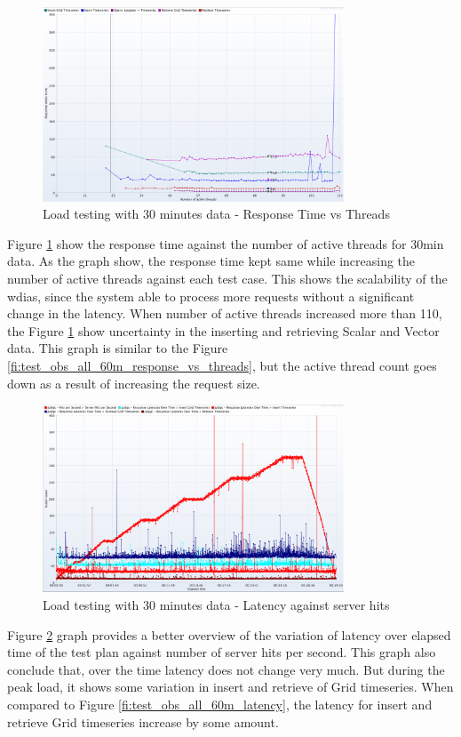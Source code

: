\begin{figure}[htp]
    \centering
    \includegraphics[width=0.8\textwidth]{results/obs/all/obs_all_30m_response_times_vs_threads.png}
    \caption{Load testing with 30 minutes data - Response Time vs Threads}
    \label{fi:test_obs_all_30m_response_vs_threads}
\end{figure}
Figure \ref{fi:test_obs_all_30m_response_vs_threads} show the response time against the number of active threads for 30min data. As the graph show, the response time kept same while increasing the number of active threads against each test case. This shows the scalability of the \acrshort{wdias}, since the system able to process more requests without a significant change in the latency.
When number of active threads increased more than 110, the Figure \ref{fi:test_obs_all_30m_response_vs_threads} show uncertainty in the inserting and retrieving Scalar and Vector data. This graph is similar to the Figure \ref{fi:test_obs_all_60m_response_vs_threads}, but the active thread count goes down as a result of increasing the request size.

\begin{figure}[htp]
    \centering
    \includegraphics[width=0.8\textwidth]{results/obs/all/obs_all_30m_res_latencies_against_hits.png}
    \caption{Load testing with 30 minutes data - Latency against server hits}
    \label{fi:test_obs_all_30m_latency}
\end{figure}
Figure \ref{fi:test_obs_all_30m_latency} graph provides a better overview of the variation of latency over elapsed time of the test plan against number of server hits per second.
This graph also conclude that, over the time latency does not change very much. But during the peak load, it shows some variation in insert and retrieve of Grid timeseries.
When compared to Figure \ref{fi:test_obs_all_60m_latency}, the latency for insert and retrieve Grid timeseries increase by some amount.


